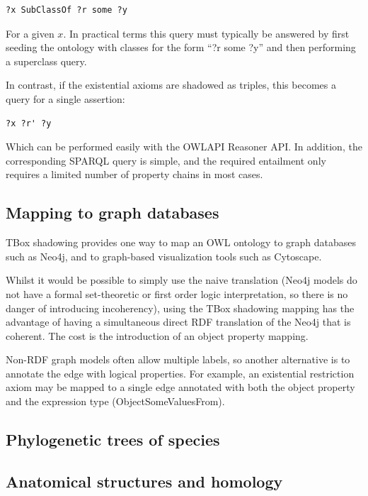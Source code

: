 \documentclass{my}
\begin{document}
\begin{verbatim}
?x SubClassOf ?r some ?y
\end{verbatim}

For a given $x$. In practical terms this query must typically be
answered by first seeding the ontology with classes for the form ``?r
some ?y'' and then performing a superclass query.

In contrast, if the existential axioms are shadowed as triples, this
becomes a query for a single assertion:

\begin{verbatim}
?x ?r' ?y
\end{verbatim}

Which can be performed easily with the OWLAPI Reasoner API. In addition, the
corresponding SPARQL query is simple, and the required entailment only
requires a limited number of property chains in most cases.

\subsection{Mapping to graph databases}

TBox shadowing provides one way to map an OWL ontology to graph
databases such as Neo4j, and to graph-based visualization tools such
as Cytoscape.

Whilst it would be possible to simply use the naive translation (Neo4j
models do not have a formal set-theoretic or first order logic
interpretation, so there is no danger of introducing incoherency),
using the TBox shadowing mapping has the advantage of having a
simultaneous direct RDF translation of the Neo4j that is coherent. The
cost is the introduction of an object property mapping.

Non-RDF graph models often allow multiple labels, so another
alternative is to annotate the edge with logical properties. For
example, an existential restriction axiom may be mapped to a single
edge annotated with both the object property and the expression type
(ObjectSomeValuesFrom). 


\subsection{Phylogenetic trees of species}



\subsection{Anatomical structures and homology}
\end{document}
